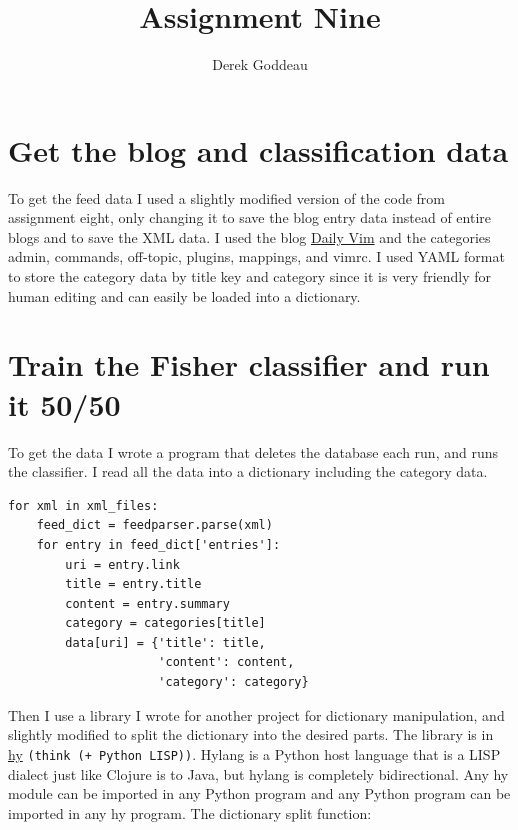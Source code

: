 \documentclass[12pt, a4paper]{article}
\author{Derek Goddeau}
\title{Assignment Nine}
\newcommand{\code}[1]{\texttt{#1}}
\begin{document}
\maketitle

\newpage



\section{Get the blog and classification data}
 
To get the feed data I used a slightly modified version of the code from assignment eight, only changing it to save the blog entry data instead of entire blogs and to save the XML data. I used the blog \href{http://dailyvim.blogspot.com/}{Daily Vim} and the categories admin, commands, off-topic, plugins, mappings, and vimrc. I used YAML format to store the category data by title key and category since it is very friendly for human editing and can easily be loaded into a dictionary.

\section{Train the Fisher classifier and run it 50/50}

To get the data I wrote a program that deletes the database each run, and runs the classifier. I read all the data into a dictionary including the category data.

\begin{minipage}{\linewidth} %
\vspace{2em}
\begin{verbatim}
for xml in xml_files:
    feed_dict = feedparser.parse(xml)
    for entry in feed_dict['entries']:
        uri = entry.link
        title = entry.title
        content = entry.summary
        category = categories[title]
        data[uri] = {'title': title,
                     'content': content,
                     'category': category}
\end{verbatim}
\vspace{2em}
\end{minipage}

\newpage
Then I use a library I wrote for another project for dictionary manipulation, and slightly modified to split the dictionary into the desired parts. The library is in \href{https://github.com/hylang/hy}{hy} \code{(think (+ Python LISP))}. Hylang is a Python host language that is a LISP dialect just like Clojure is to Java, but hylang is completely bidirectional. Any hy module can be imported in any Python program and any Python program can be imported in any hy program. The dictionary split function:
\end{document}

